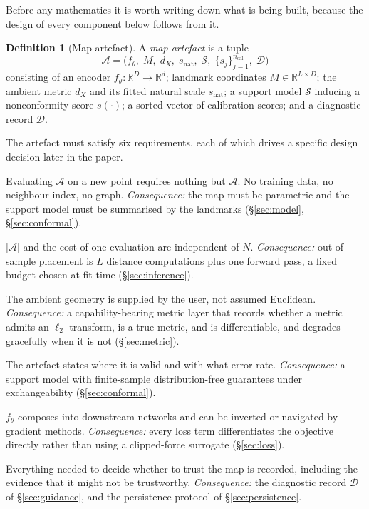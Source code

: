 \documentclass[12pt]{iopart}
\theoremstyle{definition}
\newtheorem{definition}{Definition}
\theoremstyle{plain}
\theoremstyle{remark}
\newcommand{\R}{\mathbb{R}}
\newcommand{\abs}[1]{\left\lvert#1\right\rvert}
\begin{document}
Before any mathematics it is worth writing down what is being built, because
the design of every component below follows from it.

\begin{definition}[Map artefact]
\label{def:artefact}
A \emph{map artefact} is a tuple
\[
\mathcal{A}
=
\bigl(f_\theta,\;M,\;d_X,\;s_{\mathrm{nat}},\;\mathcal{S},\;
\{s_j\}_{j=1}^{n_{\mathrm{cal}}},\;\mathcal{D}\bigr)
\]
consisting of an encoder $f_\theta:\R^D\to\R^d$; landmark coordinates
$M\in\R^{L\times D}$; the ambient metric $d_X$ and its fitted natural scale
$s_{\mathrm{nat}}$; a support model $\mathcal{S}$ inducing a nonconformity
score $s(\cdot)$; a sorted vector of calibration scores; and a diagnostic
record $\mathcal{D}$.
\end{definition}

The artefact must satisfy six requirements, each of which drives a specific
design decision later in the paper.

\begin{description}[leftmargin=0pt,style=nextline]
\item[\textnormal{(R1)} Closure.] Evaluating $\mathcal{A}$ on a new point
  requires nothing but $\mathcal{A}$. No training data, no neighbour index, no
  graph. \emph{Consequence:} the map must be parametric and the support model
  must be summarised by the landmarks (\S\ref{sec:model},
  \S\ref{sec:conformal}).
\item[\textnormal{(R2)} Bounded size and cost.] $\abs{\mathcal{A}}$ and the
  cost of one evaluation are independent of $N$. \emph{Consequence:}
  out-of-sample placement is $L$ distance computations plus one forward pass,
  a fixed budget chosen at fit time (\S\ref{sec:inference}).
\item[\textnormal{(R3)} Metric agnosticism.] The ambient geometry is supplied by
  the user, not assumed Euclidean. \emph{Consequence:} a capability-bearing
  metric layer that records whether a metric admits an $\ell_2$ transform, is a
  true metric, and is differentiable, and degrades gracefully when it is not
  (\S\ref{sec:metric}).
\item[\textnormal{(R4)} Declared domain.] The artefact states where it is valid
  and with what error rate. \emph{Consequence:} a support model with
  finite-sample distribution-free guarantees under exchangeability
  (\S\ref{sec:conformal}).
\item[\textnormal{(R5)} Differentiability.] $f_\theta$ composes into downstream
  networks and can be inverted or navigated by gradient methods.
  \emph{Consequence:} every loss term differentiates the objective directly
  rather than using a clipped-force surrogate (\S\ref{sec:loss}).
\item[\textnormal{(R6)} Auditability.] Everything needed to decide whether to
  trust the map is recorded, including the evidence that it might not be
  trustworthy. \emph{Consequence:} the diagnostic record $\mathcal{D}$ of
  \S\ref{sec:guidance}, and the persistence protocol of
  \S\ref{sec:persistence}.
\end{description}
\end{document}
